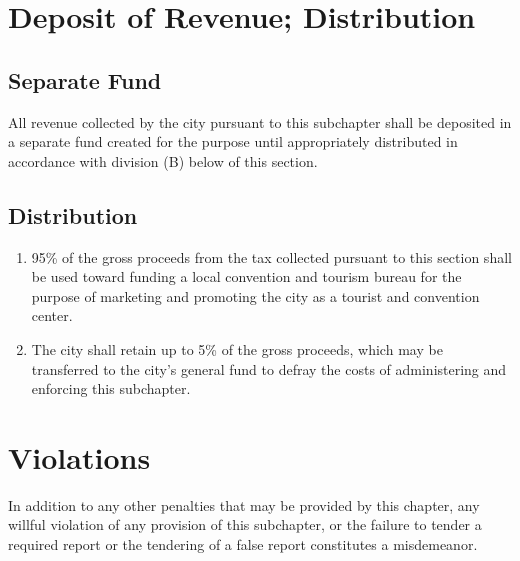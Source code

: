\section{Deposit of Revenue; Distribution}
\subsection{Separate Fund}
All revenue collected by the city pursuant to this subchapter shall be deposited in a separate fund created for the purpose until appropriately distributed in accordance with division (B) below of this section.
\subsection{Distribution}
\begin{enumerate}
    \item 95\% of the gross proceeds from the tax collected pursuant to this section shall be used toward funding a local convention and tourism bureau for the purpose of marketing and promoting the city as a tourist and convention center.
    \item The city shall retain up to 5\% of the gross proceeds, which may be transferred to the city’s general fund to defray the costs of administering and enforcing this subchapter.
\end{enumerate}

\section{Violations}
In addition to any other penalties that may be provided by this chapter, any willful violation of any provision of this subchapter, or the failure to tender a required report or the tendering of a false report constitutes a misdemeanor.
